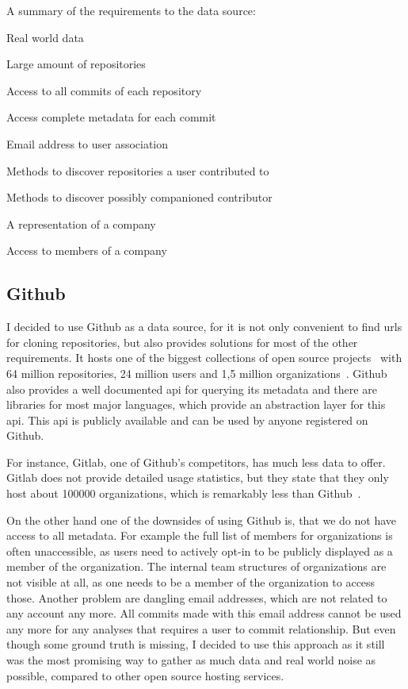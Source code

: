 \begin{itemlist}{A summary of the requirements to the data source:}
    \item Real world data
    \item Large amount of repositories
    \item Access to all commits of each repository
    \item Access complete metadata for each commit
    \item Email address to user association
    \item Methods to discover repositories a user contributed to
    \item Methods to discover possibly companioned contributor
    \item A representation of a company
    \item Access to members of a company
\end{itemlist}


\subsection{Github}\label{github}
I decided to use Github as a data source, for it is not only convenient to find \acp{url} for cloning repositories, but also provides solutions for most of the other requirements.
It hosts one of the biggest collections of open source projects~\cite{techreport:how-github-conquered} with 64 million repositories, 24 million users and 1,5 million organizations~\cite{article:github-statistics}.
Github also provides a well documented \ac{api} for querying its metadata and there are libraries for most major languages, which provide an abstraction layer for this \ac{api}.
This \ac{api} is publicly available and can be used by anyone registered on Github.

For instance, Gitlab, one of Github's competitors, has much less data to offer.
Gitlab does not provide detailed usage statistics, but they state that they only host about 100000 organizations, which is remarkably less than Github~\cite{article:gitlab-help}.

On the other hand one of the downsides of using Github is, that we do not have access to all metadata.
For example the full list of members for organizations is often unaccessible, as users need to actively opt-in to be publicly displayed as a member of the organization.
The internal team structures of organizations are not visible at all, as one needs to be a member of the organization to access those.
Another problem are dangling email addresses, which are not related to any account any more.
All commits made with this email address cannot be used any more for any analyses that requires a user to commit relationship.
But even though some ground truth is missing, I decided to use this approach as it still was the most promising way to gather as much data and real world noise as possible, compared to other open source hosting services.

